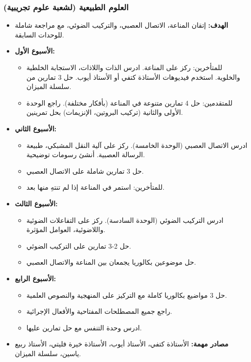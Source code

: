 \documentclass[12pt,a4paper]{book}
\begin{document}
	\subsubsection*{العلوم الطبيعية (لشعبة علوم تجريبية)}
	\begin{itemize}
		\item \textbf{الهدف:} إتقان المناعة، الاتصال العصبي، والتركيب الضوئي، مع مراجعة شاملة للوحدات السابقة.
		\item \textbf{الأسبوع الأول:}
		\begin{itemize}
			\item للمتأخرين: ركز على المناعة. ادرس الذات واللاذات، الاستجابة الخلطية والخلوية. استخدم فيديوهات الأستاذة كتفي أو الأستاذ أيوب. حل 3 تمارين من سلسلة الميزان.
			\item للمتقدمين: حل 4 تمارين متنوعة في المناعة (بأفكار مختلفة). راجع الوحدة الأولى والثانية (تركيب البروتين، الإنزيمات) بحل تمرينين.
		\end{itemize}
		\item \textbf{الأسبوع الثاني:}
		\begin{itemize}
			\item ادرس الاتصال العصبي (الوحدة الخامسة). ركز على آلية النقل المشبكي، طبيعة الرسالة العصبية. أنشئ رسومات توضيحية.
			\item حل 3 تمارين شاملة على الاتصال العصبي.
			\item للمتأخرين: استمر في المناعة إذا لم تنتهِ منها بعد.
		\end{itemize}
		\item \textbf{الأسبوع الثالث:}
		\begin{itemize}
			\item ادرس التركيب الضوئي (الوحدة السادسة). ركز على التفاعلات الضوئية واللاضوئية، العوامل المؤثرة.
			\item حل 2-3 تمارين على التركيب الضوئي.
			\item حل موضوعين بكالوريا يجمعان بين المناعة والاتصال العصبي.
		\end{itemize}
		\item \textbf{الأسبوع الرابع:}
		\begin{itemize}
			\item حل 3 مواضيع بكالوريا كاملة مع التركيز على المنهجية والنصوص العلمية.
			\item راجع جميع المصطلحات المفتاحية والأفعال الإجرائية.
			\item ادرس وحدة التنفس مع حل تمارين عليها.
		\end{itemize}
		\item \textbf{مصادر مهمة:} الأستاذة كتفي، الأستاذ أيوب، الأستاذة خيرة فليتي، الأستاذ ربيع ياسين، سلسلة الميزان.
	\end{itemize}
	
\end{document}
